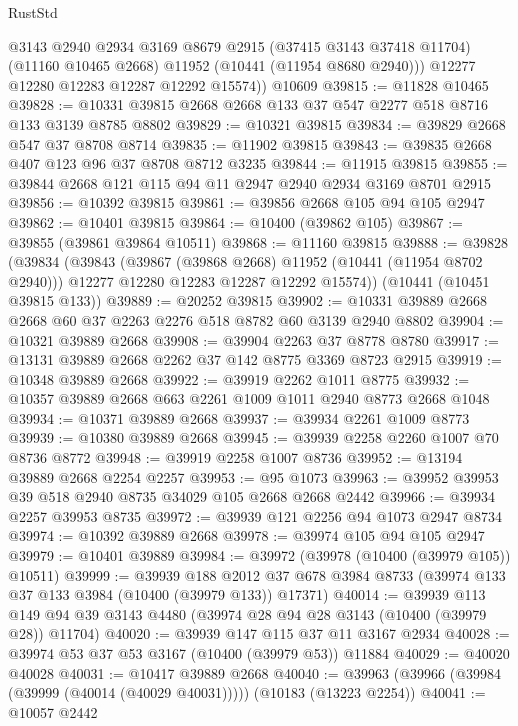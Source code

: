 \begin{lexlean}{RustStd}
\begin{coremodule}
          @3143
          @2940
          @2934
          @3169
          @8679
          @2915
          (@37415 @3143 @37418 @11704)
          (@11160 @10465 @2668)
          @11952
          (@10441 (@11954 @8680 @2940)))
        @12277
        @12280
        @12283
        @12287
        @12292
        @15574))
    @10609
@39815 := @11828 @10465
@39828 := @10331 @39815 @2668 @2668 @133 @37 @547 @2277 @518 @8716 @133 @3139 @8785 @8802
@39829 := @10321 @39815
@39834 := @39829 @2668 @547 @37 @8708 @8714
@39835 := @11902 @39815
@39843 := @39835 @2668 @407 @123 @96 @37 @8708 @8712 @3235
@39844 := @11915 @39815
@39855 := @39844 @2668 @121 @115 @94 @11 @2947 @2940 @2934 @3169 @8701 @2915
@39856 := @10392 @39815
@39861 := @39856 @2668 @105 @94 @105 @2947
@39862 := @10401 @39815
@39864 := @10400 (@39862 @105)
@39867 := @39855 (@39861 @39864 @10511)
@39868 := @11160 @39815
@39888 := @39828
    (@39834
      (@39843
        (@39867 (@39868 @2668) @11952 (@10441 (@11954 @8702 @2940)))
        @12277
        @12280
        @12283
        @12287
        @12292
        @15574))
    (@10441 (@10451 @39815 @133))
@39889 := @20252 @39815
@39902 := @10331 @39889 @2668 @2668 @60 @37 @2263 @2276 @518 @8782 @60 @3139 @2940 @8802
@39904 := @10321 @39889 @2668
@39908 := @39904 @2263 @37 @8778 @8780
@39917 := @13131 @39889 @2668 @2262 @37 @142 @8775 @3369 @8723 @2915
@39919 := @10348 @39889 @2668
@39922 := @39919 @2262 @1011 @8775
@39932 := @10357 @39889 @2668 @663 @2261 @1009 @1011 @2940 @8773 @2668 @1048
@39934 := @10371 @39889 @2668
@39937 := @39934 @2261 @1009 @8773
@39939 := @10380 @39889 @2668
@39945 := @39939 @2258 @2260 @1007 @70 @8736 @8772
@39948 := @39919 @2258 @1007 @8736
@39952 := @13194 @39889 @2668 @2254 @2257
@39953 := @95 @1073
@39963 := @39952 @39953 @39 @518 @2940 @8735 @34029 @105 @2668 @2668 @2442
@39966 := @39934 @2257 @39953 @8735
@39972 := @39939 @121 @2256 @94 @1073 @2947 @8734
@39974 := @10392 @39889 @2668
@39978 := @39974 @105 @94 @105 @2947
@39979 := @10401 @39889
@39984 := @39972 (@39978 (@10400 (@39979 @105)) @10511)
@39999 := @39939
    @188
    @2012
    @37
    @678
    @3984
    @8733
    (@39974 @133 @37 @133 @3984 (@10400 (@39979 @133)) @17371)
@40014 := @39939
    @113
    @149
    @94
    @39
    @3143
    @4480
    (@39974 @28 @94 @28 @3143 (@10400 (@39979 @28)) @11704)
@40020 := @39939 @147 @115 @37 @11 @3167 @2934
@40028 := @39974 @53 @37 @53 @3167 (@10400 (@39979 @53)) @11884
@40029 := @40020 @40028
@40031 := @10417 @39889 @2668
@40040 := @39963 (@39966 (@39984 (@39999 (@40014 (@40029 @40031))))) (@10183 (@13223 @2254))
@40041 := @10057 @2442

\end{coremodule}
\end{lexlean}
